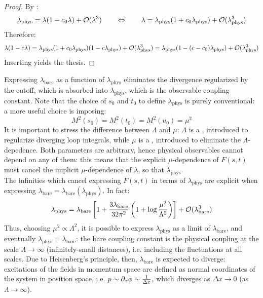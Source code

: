 \begin{proofbox}
  \begin{proof}
    By :
    \begin{equation*}
      \lambda_\text{phys} = \lambda (1 - c_0 \lambda) + \mathcal{O}(\lambda^3)
      \qquad \Leftrightarrow \qquad
      \lambda = \lambda_\text{phys} (1 + c_0 \lambda_\text{phys}) + \mathcal{O}(\lambda_\text{phys}^3)
    \end{equation*}
    Therefore:
    \begin{equation*}
      \lambda (1 - c \lambda) = \lambda_\text{phys} (1 + c_0 \lambda_\text{phys}) (1 - c \lambda_\text{phys}) + \mathcal{O}(\lambda_\text{phys}^3) = \lambda_\text{phys} (1 - (c - c_0) \lambda_\text{phys}) + \mathcal{O}(\lambda_\text{phys}^3)
    \end{equation*}
    Inserting  yields the thesis.
  \end{proof}
\end{proofbox}

Expressing $ \lambda_\text{bare} $ as a function of $ \lambda_\text{phys} $ eliminates the divergence regularized by the cutoff, which is absorbed into $ \lambda_\text{phys} $, which is the observable coupling constant. Note that the choice of $ s_0 $ and $ t_0 $ to define $ \lambda_\text{phys} $ is purely conventional: a more useful choice is imposing:
\begin{equation}
  M^2(s_0) = M^2(t_0) = M^2(u_0) = \mu^2
\end{equation}
It is important to stress the difference between $ \Lambda $ and $ \mu $: $ \Lambda $ is a , introduced to regularize diverging loop integrals, while $ \mu $ is a , introduced to eliminate the $ \Lambda $-depedence\footnotemark. Both parameters are arbitrary, hence physical observables cannot depend on any of them: this means that the explicit $ \mu $-dependence of $ F(s,t) $ must cancel the implicit $ \mu $-dependence of $ \lambda $, so that $ \lambda_\text{phys} $. \\
The infinities which cancel expressing $ F(s,t) $ in terms of $ \lambda_\text{phys} $ are explicit when expressing $ \lambda_\text{bare} = \lambda_\text{bare}(\lambda_\text{phys}) $. In fact:
\begin{equation*}
  \lambda_\text{phys} = \lambda_\text{bare} \left[ 1 + \frac{3\lambda_\text{bare}}{32\pi^2} \left( 1 + \log \frac{\mu^2}{\Lambda^2} \right) \right] + \mathcal{O}(\lambda_\text{bare}^3)
\end{equation*}
Thus, choosing $ \mu^2 \propto \Lambda^2 $, it is possible to express $ \lambda_\text{phys} $ as a limit of $ \lambda_\text{bare} $, and eventually $ \lambda_\text{phys} = \lambda_\text{bare} $: the bare coupling constant is the physical coupling at the scale $ \Lambda \rightarrow \infty $ (infinitely-small distances), i.e. including the fluctuations at all scales. Due to Heisenberg's principle, then, $ \lambda_\text{bare} $ is expected to diverge: excitations of the fields in momentum space are defined as normal coordinates of the system in position space, i.e. $ p \sim \partial_x \phi \sim \frac{1}{\Delta x} $, which diverges as $ \Delta x \rightarrow 0 $ (as $ \Lambda \rightarrow \infty $).


